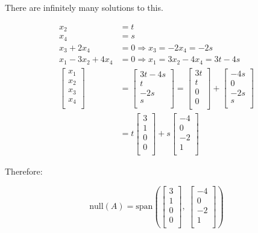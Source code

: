\documentclass[
]{article}
\begin{document}
There are infinitely many solutions to this.

\begin{align*}
x_{2} &= t
 \\
x_{4} &= s
 \\
x_{3} + 2x_{4} &= 0 \Rightarrow x_{3} = - 2x_{4} = - 2s
 \\
x_{1} - 3x_{2} + 4x_{4} &= 0 \Rightarrow x_{1} = 3x_{2} - 4x_{4} = 3t - 4s
 \\
\begin{bmatrix}
x_{1} \\
x_{2} \\
x_{3} \\
x_{4} \\
\end{bmatrix} &= \begin{bmatrix}
3t - 4s \\
t \\
 - 2s \\
s \\
\end{bmatrix} = \begin{bmatrix}
3t \\
t \\
0 \\
0 \\
\end{bmatrix} + \begin{bmatrix}
 - 4s \\
0 \\
 - 2s \\
s \\
\end{bmatrix}
 \\
&= t\begin{bmatrix}
3 \\
1 \\
0 \\
0 \\
\end{bmatrix} + s\begin{bmatrix}
 - 4 \\
0 \\
 - 2 \\
1 \\
\end{bmatrix}
\end{align*}


Therefore:

$$\text{null}(A) = \text{span}\left( \begin{bmatrix}
3 \\
1 \\
0 \\
0 \\
\end{bmatrix},\ \begin{bmatrix}
 - 4 \\
0 \\
 - 2 \\
1 \\
\end{bmatrix} \right)$$
\end{document}

